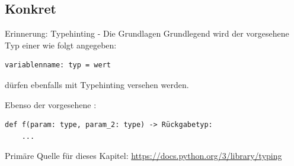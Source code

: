 \documentclass[12pt, aspectratio=169, usepdftitle=false]{beamer}
\begin{document}
\subsection{Konkret}
\begin{frame}[fragile]{Erinnerung: Typehinting - Die Grundlagen}
        Grundlegend wird der vorgesehene Typ einer  wie folgt angegeben:

		\medskip
		
		\begin{lstlisting}[language=pytiny]
variablenname: typ = wert
		\end{lstlisting}%
		
		\medskip
		
		 dürfen ebenfalls mit Typehinting versehen werden. %
		
		\medskip
		
		Ebenso der vorgesehene :
		
		\medskip
		
		\begin{lstlisting}[language=pytiny]
def f(param: type, param_2: type) -> Rückgabetyp:
    ...
		\end{lstlisting} %
		
		\medskip
		
		Primäre Quelle für dieses Kapitel: \url{https://docs.python.org/3/library/typing}

	

	
\end{frame}
\end{document}
